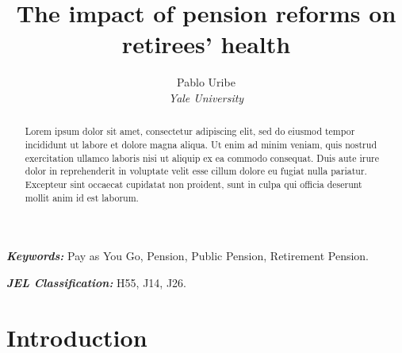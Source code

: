 \documentclass[12pt, a4paper]{article}
\begin{document}
\renewcommand{\BOthers}[1]{et al.\hbox{}}
\newcommand\fnote[1]{\captionsetup{font=footnotesize}\caption*{#1}}



\newcommand{\xxx}[2][show]{%
\ifthenelse{\equal{#1}{show}}{\textcolor{red}{X #2 X}}{}}

\title{\Large \textbf{The impact of pension reforms on retirees' health}}
\author{Pablo Uribe \\ \small \textit{Yale University}} 
\maketitle
\thispagestyle{empty}
\vspace{-0.5cm}


\begin{abstract}
    
Lorem ipsum dolor sit amet, consectetur adipiscing elit, sed do eiusmod tempor incididunt ut labore et dolore magna aliqua. Ut enim ad minim veniam, quis nostrud exercitation ullamco laboris nisi ut aliquip ex ea commodo consequat. Duis aute irure dolor in reprehenderit in voluptate velit esse cillum dolore eu fugiat nulla pariatur. Excepteur sint occaecat cupidatat non proident, sunt in culpa qui officia deserunt mollit anim id est laborum.

\end{abstract}


\textit{\textbf{Keywords:}} Pay as You Go, Pension, Public Pension, Retirement Pension.

\vspace{0.5cm}
\textit{\textbf{JEL Classification:}} H55, J14, J26.

\vspace{.5cm}

\newpage
\setcounter{page}{1}
\section{Introduction}
\end{document}
